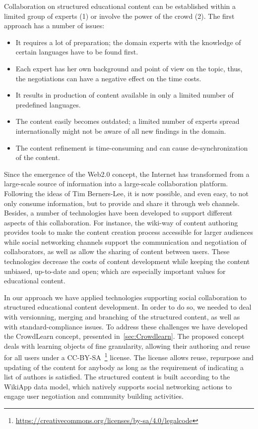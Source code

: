 \documentclass[ngerman,UKenglish,table]{scrbook}
\begin{document}
Collaboration on structured educational content can be established within a limited group of experts (1) or involve the power of the crowd (2).
The first approach has a number of issues:
\begin{itemize}
\item It requires a lot of preparation; the domain experts with the knowledge of certain languages have to be found first.
\item Each expert has her own background and point of view on the topic, thus, the negotiations can have a negative effect on the time costs. 
\item It results in production of content available in only a limited number of predefined languages.
\item The content easily becomes outdated; a limited number of experts spread internationally might not be aware of all new findings in the domain.
\item The content refinement is time-consuming and can cause de-synchronization of the content.
\end{itemize}

Since the emergence of the Web2.0 concept, the Internet has transformed from a large-scale source of information into a large-scale collaboration platform.
Following the ideas of Tim Berners-Lee, it is now possible, and even easy, to not only consume information, but to provide and share it through web channels.
Besides, a number of technologies have been developed to support different aspects of this collaboration.
For instance, the wiki-way of content authoring provides tools to make the content creation process accessible for larger audiences while social networking channels support the communication and negotiation of collaborators, as well as allow the sharing of content between users.
These technologies decrease the costs of content development while keeping the content unbiased, up-to-date and open; which are especially important values for educational content.

In our approach we have applied technologies supporting social collaboration to structured educational content development.
In order to do so, we needed to deal with versionning, merging and branching of the structured content, as well as with standard-compliance issues.
To address these challenges we have developed the CrowdLearn concept, presented in~\autoref{sec:Crowdlearn}.
The proposed concept deals with learning objects of fine granularity, allowing their authoring and reuse for all users under a CC-BY-SA~\footnote{\url{https://creativecommons.org/licenses/by-sa/4.0/legalcode}} license.
The license allows reuse, repurpose and updating of the content for anybody as long as the requirement of indicating a list of authors is satisfied.
The structured content is built according to the WikiApp data model, which natively supports social networking actions to engage user negotiation and community building activities.
\end{document}
